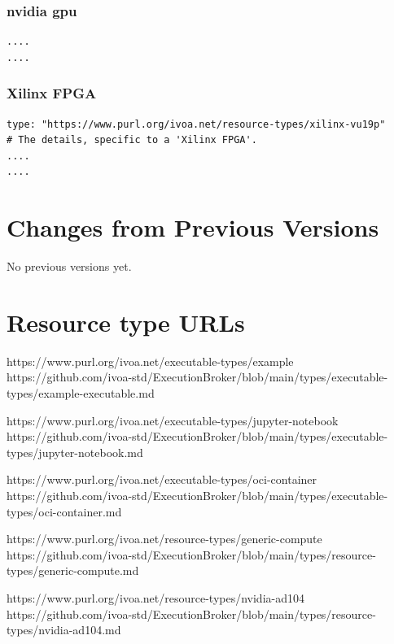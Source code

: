 \documentclass[11pt,a4paper]{ivoa}
\begin{document}
\subsubsection{nvidia gpu}
\label{datamodel-nvidia-gpu}

\begin{lstlisting}[]
....
....
\end{lstlisting}

\subsubsection{Xilinx FPGA}
\label{datamodel-xilinx-fpga}

\begin{lstlisting}[]
type: "https://www.purl.org/ivoa.net/resource-types/xilinx-vu19p"
# The details, specific to a 'Xilinx FPGA'.
....
....
\end{lstlisting}


\pagebreak
\appendix
\section{Changes from Previous Versions}

No previous versions yet.

\pagebreak
\appendix
\section{Resource type URLs}


https://www.purl.org/ivoa.net/executable-types/example
https://github.com/ivoa-std/ExecutionBroker/blob/main/types/executable-types/example-executable.md

https://www.purl.org/ivoa.net/executable-types/jupyter-notebook
https://github.com/ivoa-std/ExecutionBroker/blob/main/types/executable-types/jupyter-notebook.md

https://www.purl.org/ivoa.net/executable-types/oci-container
https://github.com/ivoa-std/ExecutionBroker/blob/main/types/executable-types/oci-container.md

https://www.purl.org/ivoa.net/resource-types/generic-compute
https://github.com/ivoa-std/ExecutionBroker/blob/main/types/resource-types/generic-compute.md

https://www.purl.org/ivoa.net/resource-types/nvidia-ad104
https://github.com/ivoa-std/ExecutionBroker/blob/main/types/resource-types/nvidia-ad104.md
\end{document}

